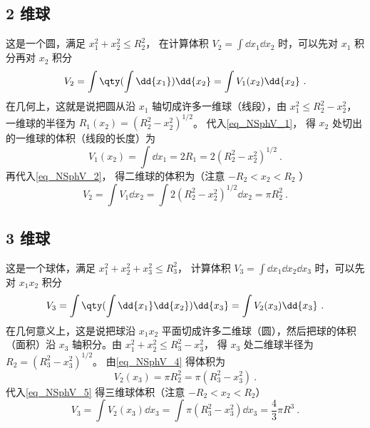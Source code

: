 \subsection{ 2 维球}
这是一个圆，满足 $x_1^2 + x_2^2 \leqslant R_2^2$， 在计算体积 $V_2 = \int \dd{x_1}\dd{x_2}$ 时，可以先对 $x_1$ 积分再对 $x_2$ 积分
\begin{equation}\label{eq_NSphV_2}
V_2 = \int \qty(\int \dd{x_1}) \dd{x_2}  = \int V_1(x_2) \dd{x_2}~.
\end{equation}
在几何上，这就是说把圆从沿 $x_1$ 轴切成许多一维球（线段），由 $x_1^2 \leqslant R_2^2 - x_2^2$， 一维球的半径为 $R_1(x_2) = (R_2^2 - x_2^2)^{1/2}$。 代入\autoref{eq_NSphV_1}， 得 $x_2$ 处切出的一维球的体积（线段的长度）为
\begin{equation}\label{eq_NSphV_3}
V_1 (x_2) = \int \dd{x_1} = 2R_1 = 2(R_2^2 - x_2^2)^{1/2}~.
\end{equation}
再代入\autoref{eq_NSphV_2}， 得二维球的体积为（注意 $ -R_2 < x_2 < R_2$ ）
\begin{equation}\label{eq_NSphV_4}
V_2 = \int V_1 \dd{x_2} = \int 2 (R_2^2 - x_2^2)^{1/2} \dd{x_2}  = \pi R_2^2~.
\end{equation}
\subsection{ 3 维球}
这是一个球体，满足 $x_1^2 + x_2^2 + x_3^2 \leqslant R_3^2$， 计算体积 $V_3 = \int \dd{x_1}\dd{x_2} \dd{x_3}$ 时，可以先对 $x_1 x_2$ 积分
\begin{equation}\label{eq_NSphV_5}
V_3 = \int \qty(\int \dd{x_1} \dd{x_2}) \dd{x_3} = \int V_2(x_3) \dd{x_3}~.
\end{equation}
在几何意义上，这是说把球沿 $x_1 x_2$ 平面切成许多二维球（圆），然后把球的体积（面积）沿 $x_3$ 轴积分。由 $x_1^2 + x_2^2 \leqslant R_3^2 - x_3^2$， 得 $x_3$ 处二维球半径为 $R_2 = (R_3^2 - x_3^2)^{1/2}$。 由\autoref{eq_NSphV_4} 得体积为
\begin{equation}\label{eq_NSphV_6}
V_2 (x_3) = \pi R_2^2 = \pi (R_3^2 - x_3^2)~.
\end{equation}
代入\autoref{eq_NSphV_5} 得三维球体积（注意 $-R_2 < x_2 < R_2$）
\begin{equation}\label{eq_NSphV_7}
V_3 = \int V_2(x_3) \dd{x_3} = \int \pi (R_3^2 - x_3^2)\dd{x_3}  = \frac43 \pi R^3~.
\end{equation}
